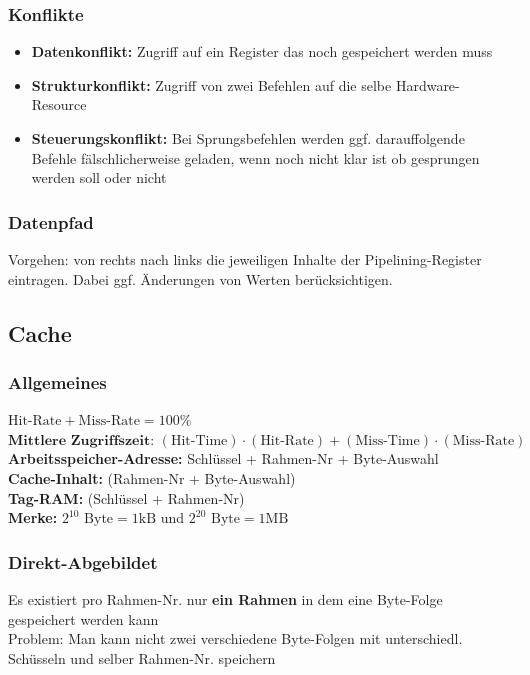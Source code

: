 \documentclass[ngerman, threecolumn, 8pt]{latex4ei/latex4ei_sheet}
\begin{document}
\subsubsection{Konflikte}
\begin{itemize}\itemsep0pt
\item \textbf{Datenkonflikt:} Zugriff auf ein Register das noch gespeichert werden muss
\item \textbf{Strukturkonflikt:} Zugriff von zwei Befehlen auf die selbe Hardware-Resource 
\item \textbf{Steuerungskonflikt:} Bei Sprungsbefehlen werden ggf. darauffolgende Befehle fälschlicherweise geladen, wenn noch nicht klar ist ob gesprungen werden soll oder nicht
\end{itemize}
\subsubsection{Datenpfad}
Vorgehen: von rechts nach links die jeweiligen Inhalte der Pipelining-Register eintragen. Dabei ggf. Änderungen von Werten berücksichtigen.
\begin{minipage}{\columnwidth}
\subsection{Cache}
\subsubsection{Allgemeines}
$\text{Hit-Rate} + \text{Miss-Rate} = 100\%$ \\
$\textbf{Mittlere Zugriffszeit: } (\text{Hit-Time}) \cdot (\text{Hit-Rate}) + (\text{Miss-Time}) \cdot (\text{Miss-Rate})$ \\
\textbf{Arbeitsspeicher-Adresse:} Schlüssel + Rahmen-Nr + Byte-Auswahl \\
\textbf{Cache-Inhalt:} (Rahmen-Nr + Byte-Auswahl)\\
\textbf{Tag-RAM:} (Schlüssel + Rahmen-Nr)\\
\textbf{Merke:} $2^{10} \text{ Byte}= 1 \text{kB}$ und $2^{20} \text{ Byte}=1 \text{MB}$\\
\end{minipage}
\subsubsection{Direkt-Abgebildet}
Es existiert pro Rahmen-Nr. nur \textbf{ein Rahmen} in dem eine Byte-Folge gespeichert werden kann \\
Problem: Man kann nicht zwei verschiedene Byte-Folgen mit unterschiedl. Schüsseln und selber Rahmen-Nr. speichern
\end{document}
